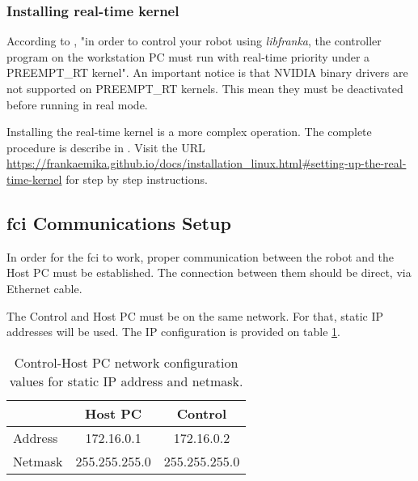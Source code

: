 
\subsubsection*{Installing real-time kernel}
\label{subsubsec:ros_setup_robotic_system_integration_ros_installation_realtime_kernel}

According to \cite{FrankaEmikaGmbH_fci_documentation}, "in order to control your robot using \textit{libfranka}, the controller program on the workstation PC must run with real-time priority under a PREEMPT\_RT kernel". An important notice is that NVIDIA binary drivers are not supported on PREEMPT\_RT kernels. This mean they must be deactivated before running in real mode.

Installing the real-time kernel is a more complex operation. The complete procedure is describe in \cite{FrankaEmikaGmbH_fci_documentation}. Visit the URL \url{https://frankaemika.github.io/docs/installation_linux.html#setting-up-the-real-time-kernel} for step by step instructions.



\subsection{\gls{fci} Communications Setup}
\label{subsec:ros_setup_robotic_system_integration_ros_comms_setup}

In order for the \gls{fci} to work, proper communication between the robot and the Host PC must be established. The connection between them should be direct, via Ethernet cable.

The Control and Host PC must be on the same network. For that, static IP addresses will be used. The IP configuration is provided on table \ref{tab:communicaton_setup_ips}.

\begin{table}[htbp]
    \caption{Control-Host PC network configuration values for static IP address and netmask.}
    \centering
    \begin{tabular}{l|c|c}
        \toprule
         & Host PC & Control \\
        \midrule 
         Address & 172.16.0.1 & 172.16.0.2 \\ 
         Netmask & 255.255.255.0 & 255.255.255.0 \\
         \bottomrule
    \end{tabular}
    \label{tab:communicaton_setup_ips}
\end{table}

